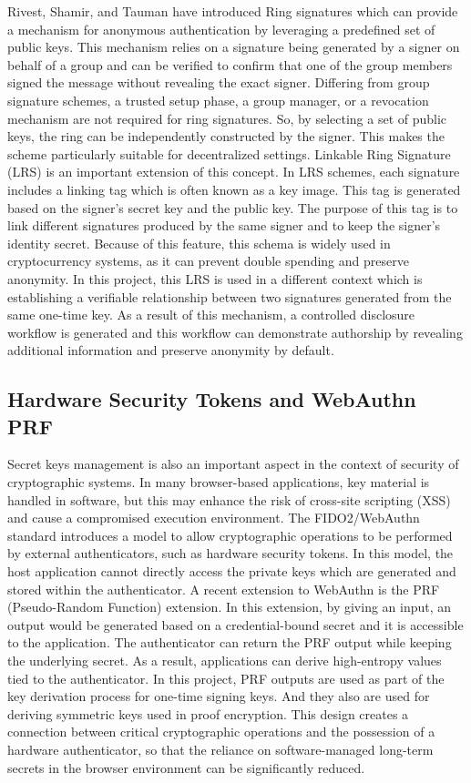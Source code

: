\documentclass[letterpaper,11pt]{article}
\begin{document}
Rivest, Shamir, and Tauman have introduced Ring signatures which can provide a mechanism for anonymous authentication by leveraging a predefined set of public keys. This mechanism relies on a signature being generated by a signer on behalf of a group and can be verified to confirm that one of the group members signed the message without revealing the exact signer.
Differing from group signature schemes, a trusted setup phase, a group manager, or a revocation mechanism are not required for ring signatures. So, by selecting a set of public keys, the ring can be independently constructed by the signer. This makes the scheme particularly suitable for decentralized settings.
Linkable Ring Signature (LRS) is an important extension of this concept. In LRS schemes, each signature includes a linking tag which is often known as a key image. This tag is generated based on the signer's secret key and the public key. The purpose of this tag is to link different signatures produced by the same signer and to keep the signer’s identity secret. Because of this feature, this schema is widely used in cryptocurrency systems, as it can prevent double spending and preserve anonymity.
In this project, this LRS is used in a different context which is establishing a verifiable relationship between two signatures generated from the same one-time key. As a result of this mechanism, a controlled disclosure workflow is generated and this workflow can demonstrate authorship by revealing additional information and preserve anonymity by default.

\subsection{Hardware Security Tokens and WebAuthn PRF}

Secret keys management is also an important aspect in the context of security of cryptographic systems. In many browser-based applications, key material is handled in software, but this may enhance the risk of cross-site scripting (XSS) and cause a compromised execution environment.
The FIDO2/WebAuthn standard introduces a model to allow cryptographic operations to be performed by external authenticators, such as hardware security tokens. In this model, the host application cannot directly access the private keys which are generated and stored within the authenticator.
A recent extension to WebAuthn is the PRF (Pseudo-Random Function) extension. In this extension, by giving an input, an output would be generated based on a credential-bound secret and it is accessible to the application. The authenticator can return the PRF output while keeping the underlying secret. As a result, applications can derive high-entropy values tied to the authenticator.
In this project, PRF outputs are used as part of the key derivation process for one-time signing keys. And they also are used for deriving symmetric keys used in proof encryption. This design creates a connection between critical cryptographic operations and the possession of a hardware authenticator, so that the reliance on software-managed long-term secrets in the browser environment can be significantly reduced.
\end{document}
